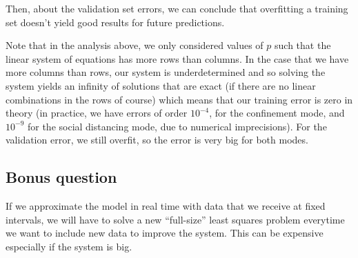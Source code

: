 \documentclass[11pt]{article}
\begin{document}
Then, about the validation set errors, we can conclude that overfitting a training set doesn't yield good results for future predictions.

Note that in the analysis above, we only considered values of \(p\) such that the linear system of equations has more rows than columns.
In the case that we have more columns than rows, our system is underdetermined and so solving the system yields an infinity of solutions that are exact (if there are no linear combinations in the rows of course) which means that our training error is zero in theory (in practice, we have errors of order $10^{-4}$, for the confinement mode, and $10^{-9}$ for the social distancing mode, due to numerical imprecisions). For the validation error, we still overfit, so the error is very big for both modes.

\subsection*{Bonus question}
If we approximate the model in real time with data that we receive at fixed intervals, we will have to solve a new ``full-size'' least squares problem everytime we want to include new data to improve the system. This can be expensive especially if the system is big.
\end{document}
